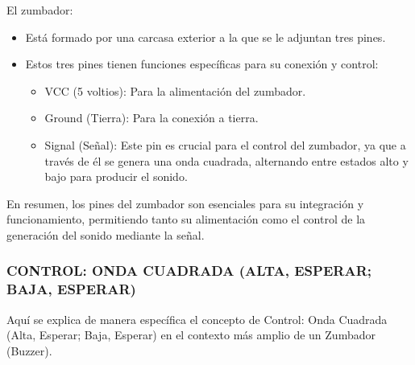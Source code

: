 \documentclass{report}
\begin{document}
El zumbador:
\begin{itemize}
    \item Está formado por una carcasa exterior a la que se le adjuntan tres pines.
    \item Estos tres pines tienen funciones específicas para su conexión y control:
    \begin{itemize}
        \item VCC (5 voltios): Para la alimentación del zumbador.
        \item Ground (Tierra): Para la conexión a tierra.
        \item Signal (Señal): Este pin es crucial para el control del zumbador, ya que a través de él se genera una onda cuadrada, alternando entre estados 
        alto y bajo para producir el sonido.
    \end{itemize}
\end{itemize}
En resumen, los pines del zumbador son esenciales para su integración y funcionamiento, permitiendo tanto su alimentación como el control de la generación 
del sonido mediante la señal.

\subsubsection{CONTROL: ONDA CUADRADA (ALTA, ESPERAR; BAJA, ESPERAR)}
Aquí se explica de manera específica el concepto de Control: Onda Cuadrada (Alta, Esperar; Baja, Esperar) en el contexto más amplio 
de un Zumbador (Buzzer).
\end{document}
